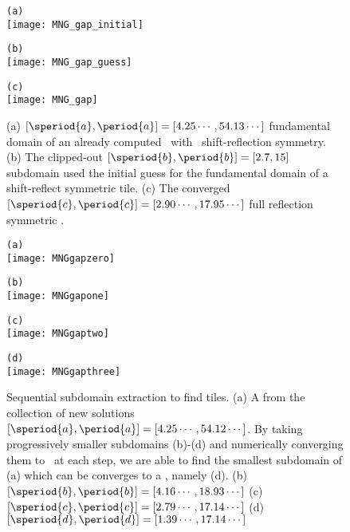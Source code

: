 \begin{figure}
\begin{minipage}[height=.3\textheight]{.5\textwidth}
\centering \small{\texttt{(a)}}\\
\texttt{[image: MNG\_gap\_initial]}
\end{minipage}
\begin{minipage}[height=.3\textheight]{.5\textwidth}
\centering \small{\texttt{(b)}}\\
\texttt{[image: MNG\_gap\_guess]}
\end{minipage}
\begin{minipage}[height=.1\textheight]{\textwidth}
\centering \small{\texttt{(c)}}\\
\texttt{[image: MNG\_gap]}
\end{minipage}
\caption{ \label{fig:gap}
(a)
$[\speriod{a},\period{a}]=[4.25\cdots,54.13\cdots]$ fundamental domain
of an already computed \twot\ with \spt\ shift-reflection symmetry.
(b)
The clipped-out $[\speriod{b},\period{b}]=[2.7,15]$ subdomain used the
initial guess for the fundamental domain of a shift-reflect symmetric tile.
(c)
The converged $[\speriod{c},\period{c}]=[2.90\cdots,17.95\cdots]$ full
reflection symmetric \twot.
}
\end{figure}

\begin{figure}
\begin{minipage}[height=.2\textheight]{.5\textwidth}
\centering \small{\texttt{(a)}}\\
\texttt{[image: MNGgapzero]}
\end{minipage}
\begin{minipage}[height=.2\textheight]{.5\textwidth}
\centering \small{\texttt{(b)}}\\
\texttt{[image: MNGgapone]}
\end{minipage}
\begin{minipage}[height=.2\textheight]{.5\textwidth}
\centering \small{\texttt{(c)}}\\
\texttt{[image: MNGgaptwo]}
\end{minipage}
\begin{minipage}[height=.2\textheight]{.48\textwidth}
\centering \small{\texttt{(d)}}\\
\texttt{[image: MNGgapthree]}
\end{minipage}
\caption{ \label{fig:KStileextraction}
Sequential subdomain extraction to find tiles.
(a) A {\po} from the collection of new solutions
$[\speriod{a},\period{a}]=[4.25\cdots,54.12\cdots]$.
By taking progressively smaller subdomains (b)-(d) and numerically
converging them to \twots\ at each step, we are able to
find the smallest subdomain of (a) which can be converges
to a \twot, namely (d).
(b)$[\speriod{b},\period{b}]=[4.16\cdots,18.93\cdots]$
(c)$[\speriod{c},\period{c}]=[2.79\cdots,17.14\cdots]$
(d)$[\speriod{d},\period{d}]=[1.39\cdots,17.14\cdots]$
}
\end{figure}